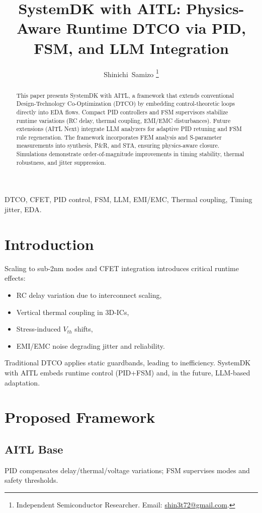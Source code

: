 \documentclass[journal]{IEEEtran} %
\title{SystemDK with AITL: Physics-Aware Runtime DTCO via PID, FSM, and LLM Integration}
\author{Shinichi~Samizo%
\thanks{Independent Semiconductor Researcher. Email: \href{mailto:shin3t72@gmail.com}{shin3t72@gmail.com}.}
}
\begin{document}
\maketitle

\begin{abstract}
This paper presents SystemDK with AITL, a framework that extends conventional Design-Technology Co-Optimization (DTCO) by embedding control-theoretic loops directly into EDA flows. Compact PID controllers and FSM supervisors stabilize runtime variations (RC delay, thermal coupling, EMI/EMC disturbances). Future extensions (AITL Next) integrate LLM analyzers for adaptive PID retuning and FSM rule regeneration. The framework incorporates FEM analysis and S-parameter measurements into synthesis, P\&R, and STA, ensuring physics-aware closure. Simulations demonstrate order-of-magnitude improvements in timing stability, thermal robustness, and jitter suppression.
\end{abstract}

\begin{IEEEkeywords}
DTCO, CFET, PID control, FSM, LLM, EMI/EMC, Thermal coupling, Timing jitter, EDA.
\end{IEEEkeywords}

\section{Introduction}
Scaling to sub-2nm nodes and CFET integration introduces critical runtime effects:
\begin{itemize}
  \item RC delay variation due to interconnect scaling,
  \item Vertical thermal coupling in 3D-ICs,
  \item Stress-induced $V_{th}$ shifts,
  \item EMI/EMC noise degrading jitter and reliability.
\end{itemize}
Traditional DTCO applies static guardbands, leading to inefficiency. SystemDK with AITL embeds runtime control (PID+FSM) and, in the future, LLM-based adaptation.

\section{Proposed Framework}
\subsection{AITL Base}
PID compensates delay/thermal/voltage variations; FSM supervises modes and safety thresholds.
\end{document}
